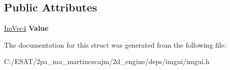 \subsection*{Public Attributes}
\begin{DoxyCompactItemize}
\item 
\mbox{\label{struct_im_color_a4cf43bd58e30decaa0248f839fc85e95}} 
\hyperlink{struct_im_vec4}{Im\+Vec4} {\bfseries Value}
\end{DoxyCompactItemize}


The documentation for this struct was generated from the following file\+:\begin{DoxyCompactItemize}
\item 
C\+:/\+E\+S\+A\+T/2pa\+\_\+ma\+\_\+martinezcajm/2d\+\_\+engine/deps/imgui/imgui.\+h\end{DoxyCompactItemize}
